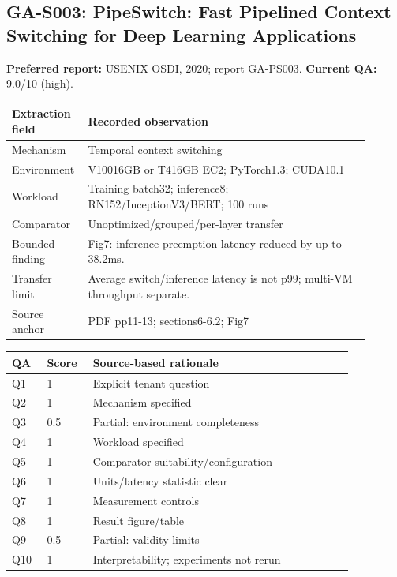\subsection{GA-S003: PipeSwitch: Fast Pipelined Context Switching for Deep Learning Applications}
\textbf{Preferred report:} USENIX OSDI, 2020; report GA-PS003. \textbf{Current QA:} 9.0/10 (high).
\begin{longtable}{P{0.15\linewidth}P{0.75\linewidth}}
\toprule Extraction field & Recorded observation\\\midrule\endhead
Mechanism & Temporal context switching\\
Environment & V10016GB or T416GB EC2; PyTorch1.3; CUDA10.1\\
Workload & Training batch32; inference8; RN152/InceptionV3/BERT; 100 runs\\
Comparator & Unoptimized/grouped/per-layer transfer\\
Bounded finding & Fig7: inference preemption latency reduced by up to 38.2ms.\\
Transfer limit & Average switch/inference latency is not p99; multi-VM throughput separate.\\
Source anchor & PDF pp11-13; sections6-6.2; Fig7\\
\bottomrule\end{longtable}
\begin{longtable}{P{0.09\linewidth}P{0.10\linewidth}P{0.67\linewidth}}
\toprule QA & Score & Source-based rationale\\\midrule\endhead
Q1 & 1 & Explicit tenant question\\
Q2 & 1 & Mechanism specified\\
Q3 & 0.5 & Partial: environment completeness\\
Q4 & 1 & Workload specified\\
Q5 & 1 & Comparator suitability/configuration\\
Q6 & 1 & Units/latency statistic clear\\
Q7 & 1 & Measurement controls\\
Q8 & 1 & Result figure/table\\
Q9 & 0.5 & Partial: validity limits\\
Q10 & 1 & Interpretability; experiments not rerun\\
\bottomrule\end{longtable}

